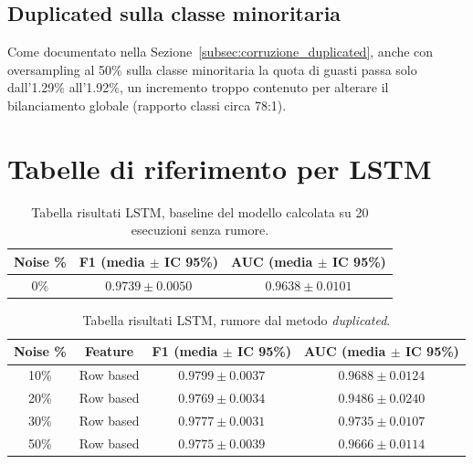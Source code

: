 \documentclass[../main.tex]{subfiles}
\begin{document}
\subsection{Duplicated sulla classe minoritaria}
\label{subsec:lstm_duplicated_minority}

Come documentato nella Sezione~\ref{subsec:corruzione_duplicated}, anche con oversampling al 50\% sulla classe minoritaria la quota di guasti passa solo dall'1.29\% all'1.92\%, un incremento troppo contenuto per alterare il bilanciamento globale (rapporto classi circa 78:1).


\newpage


\section{Tabelle di riferimento per LSTM}
\begin{table}[H]
\centering\small
{}
\begin{tabular}{ccc}
\toprule
\textbf{Noise \%} & \textbf{F1 (media $\pm$ IC 95\%)} & \textbf{AUC (media $\pm$ IC 95\%)} \\
\midrule
0\%  & $0.9739 \pm 0.0050$ & $0.9638 \pm 0.0101$ \\
\bottomrule
\end{tabular}
\caption{Tabella risultati LSTM, baseline del modello calcolata su 20 esecuzioni senza rumore.}
\label{tab:lstm_baseline}
\end{table}

\begin{table}[H]
\centering\small
{}
\begin{tabular}{cccc}
\toprule
\textbf{Noise \%} & \textbf{Feature} & \textbf{F1 (media $\pm$ IC 95\%)} & \textbf{AUC (media $\pm$ IC 95\%)} \\
\midrule
10\% & Row based & $0.9799 \pm 0.0037$ & $0.9688 \pm 0.0124$ \\
20\% & Row based & $0.9769 \pm 0.0034$ & $0.9486 \pm 0.0240$ \\
30\% & Row based & $0.9777 \pm 0.0031$ & $0.9735 \pm 0.0107$ \\
50\% & Row based & $0.9775 \pm 0.0039$ & $0.9666 \pm 0.0114$ \\
\bottomrule
\end{tabular}
\caption{Tabella risultati LSTM, rumore dal metodo \textit{duplicated}.}
\label{tab:lstm_duplicated}
\end{table}
\end{document}
